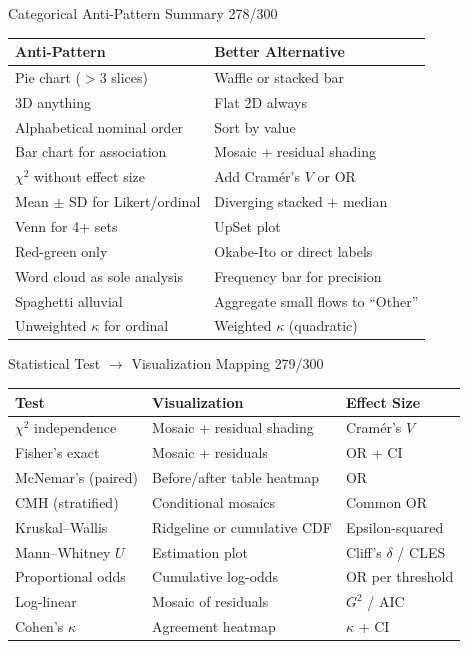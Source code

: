 \documentclass[10pt]{beamer}
\newcommand{\smark}[1]{\hfill{\scriptsize\color{codegray}#1}}
\begin{document}
\begin{frame}{Categorical Anti-Pattern Summary}
\smark{278/300}
\centering\small
\begin{tabular}{@{}ll@{}}
    \toprule
    \textbf{Anti-Pattern} & \textbf{Better Alternative} \\
    \midrule
    Pie chart ($> 3$ slices)                  & Waffle or stacked bar \\
    3D anything                               & Flat 2D always \\
    Alphabetical nominal order                & Sort by value \\
    Bar chart for association                  & Mosaic + residual shading \\
    $\chi^2$ without effect size              & Add Cram\'er's $V$ or OR \\
    Mean $\pm$ SD for Likert/ordinal          & Diverging stacked + median \\
    Venn for 4+ sets                          & UpSet plot \\
    Red-green only                            & Okabe-Ito or direct labels \\
    Word cloud as sole analysis               & Frequency bar for precision \\
    Spaghetti alluvial                        & Aggregate small flows to ``Other'' \\
    Unweighted $\kappa$ for ordinal           & Weighted $\kappa$ (quadratic) \\
    \bottomrule
\end{tabular}
\end{frame}

\begin{frame}{Statistical Test $\to$ Visualization Mapping}
\smark{279/300}
\centering\small
\begin{tabular}{@{}lll@{}}
    \toprule
    \textbf{Test} & \textbf{Visualization} & \textbf{Effect Size} \\
    \midrule
    $\chi^2$ independence     & Mosaic + residual shading   & Cram\'er's $V$ \\
    Fisher's exact            & Mosaic + residuals           & OR + CI \\
    McNemar's (paired)        & Before/after table heatmap   & OR \\
    CMH (stratified)          & Conditional mosaics          & Common OR \\
    Kruskal--Wallis           & Ridgeline or cumulative CDF  & Epsilon-squared \\
    Mann--Whitney $U$         & Estimation plot              & Cliff's $\delta$ / CLES \\
    Proportional odds         & Cumulative log-odds          & OR per threshold \\
    Log-linear                & Mosaic of residuals          & $G^2$ / AIC \\
    Cohen's $\kappa$          & Agreement heatmap            & $\kappa$ + CI \\
    \bottomrule
\end{tabular}
\end{frame}
\end{document}
